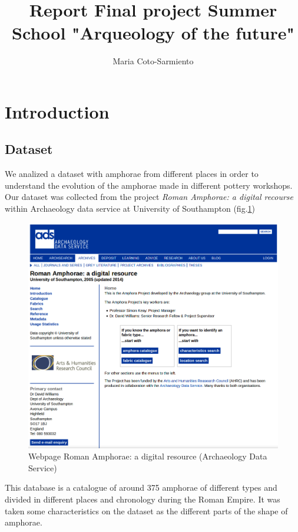 \documentclass[10pt,a4paper]{article}
\author{Maria Coto-Sarmiento}
\title{Report Final project Summer School "Arqueology of the future"}
\begin{document}
\maketitle

\section{Introduction}


\subsection{Dataset}

We analized a dataset with amphorae from different places in order to understand the evolution of the amphorae made in different pottery workshops. Our dataset was collected from the project \emph{Roman Amphorae: a digital recourse} within Archaeology data service at University of Southampton (fig.\ref{picwebarch})

\begin{figure}[htp]
	\centering
\includegraphics[scale=0.30]{picture1.png}
\caption{Webpage Roman Amphorae: a digital resource (Archaeology Data Service)}
\label{picwebarch}
\end{figure} 

This database is a catalogue of around 375 amphorae of different types and divided in different places and chronology during the Roman Empire. It was taken some characteristics on the dataset as the different parts of the shape of amphorae. 
\end{document}
